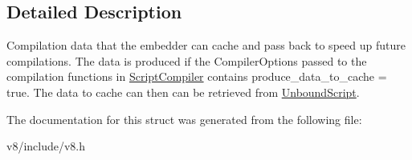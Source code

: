 \subsection{Detailed Description}
Compilation data that the embedder can cache and pass back to speed up future compilations. The data is produced if the Compiler\+Options passed to the compilation functions in \hyperlink{classv8_1_1ScriptCompiler}{Script\+Compiler} contains produce\+\_\+data\+\_\+to\+\_\+cache = true. The data to cache can then can be retrieved from \hyperlink{classv8_1_1UnboundScript}{Unbound\+Script}. 

The documentation for this struct was generated from the following file\+:\begin{DoxyCompactItemize}
\item 
v8/include/v8.\+h\end{DoxyCompactItemize}
